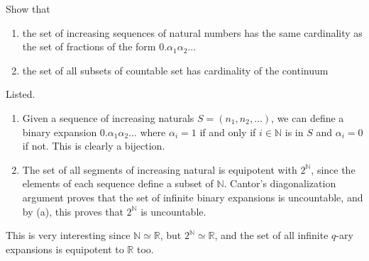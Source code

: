   \begin{exercise}[Zorich 2.4.4]
    Show that
    \begin{enumerate}
      \item the set of increasing sequences of natural numbers has the same cardinality as the set of fractions of the form $0.\alpha_1 \alpha_2 \ldots$ 
      \item the set of all subsets of countable set has cardinality of the continuum
    \end{enumerate}
  \end{exercise}
  \begin{solution}
    Listed. 
    \begin{enumerate}
      \item Given a sequence of increasing naturals $S = (n_1, n_2, \ldots)$, we can define a binary expansion $0.\alpha_1 \alpha_2 \ldots$ where $\alpha_i = 1$ if and only if $i \in \mathbb{N}$ is in $S$ and $\alpha_i = 0$ if not. This is clearly a bijection. 
      \item The set of all segments of increasing natural is equipotent with $2^\mathbb{N}$, since the elements of each sequence define a subset of $\mathbb{N}$. Cantor's diagonalization argument proves that the set of infinite binary expansions is uncountable, and by (a), this proves that $2^\mathbb{N}$ is uncountable. 
    \end{enumerate}
    This is very interesting since $\mathbb{N} \simeq \mathbb{R}$, but $2^{\mathbb{N}} \simeq \mathbb{R}$, and the set of all infinite $q$-ary expansions is equipotent to $\mathbb{R}$ too. 
  \end{solution}

